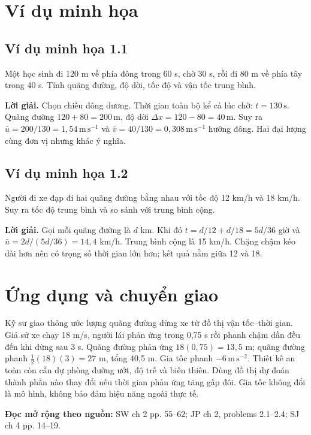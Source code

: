 \documentclass[11pt,a4paper,openany]{book}
\begin{document}
\section{Ví dụ minh họa}
\subsection*{Ví dụ minh họa 1.1}
Một học sinh đi 120 m về phía đông trong 60 s, chờ 30 s, rồi đi 80 m về phía tây trong 40 s. Tính quãng đường, độ dời, tốc độ và vận tốc trung bình.

\textbf{Lời giải.} Chọn chiều đông dương. Thời gian toàn bộ kể cả lúc chờ: $t=130\,\mathrm{s}$. Quãng đường $120+80=200\,\mathrm{m}$, độ dời $\Delta x=120-80=40\,\mathrm{m}$. Suy ra $\bar u=200/130=1{,}54\,\mathrm{m\,s^{-1}}$ và $\bar v=40/130=0{,}308\,\mathrm{m\,s^{-1}}$ hướng đông. Hai đại lượng cùng đơn vị nhưng khác ý nghĩa.
\subsection*{Ví dụ minh họa 1.2}
Người đi xe đạp đi hai quãng đường bằng nhau với tốc độ 12 km/h và 18 km/h. Suy ra tốc độ trung bình và so sánh với trung bình cộng.

\textbf{Lời giải.} Gọi mỗi quãng đường là $d$ km. Khi đó $t=d/12+d/18=5d/36$ giờ và $\bar u=2d/(5d/36)=14{,}4$ km/h. Trung bình cộng là 15 km/h. Chặng chậm kéo dài hơn nên có trọng số thời gian lớn hơn; kết quả nằm giữa 12 và 18.
\section{Ứng dụng và chuyển giao}
Kỹ sư giao thông ước lượng quãng đường dừng xe từ đồ thị vận tốc--thời gian. Giả sử xe chạy 18 m/s, người lái phản ứng trong 0,75 s rồi phanh chậm dần đều đến khi dừng sau 3 s. Quãng đường phản ứng $18(0{,}75)=13{,}5$ m; quãng đường phanh $\frac12(18)(3)=27$ m, tổng 40,5 m. Gia tốc phanh $-6\,\mathrm{m\,s^{-2}}$. Thiết kế an toàn còn cần dự phòng đường ướt, độ trễ và biến thiên. Dùng đồ thị dự đoán thành phần nào thay đổi nếu thời gian phản ứng tăng gấp đôi. Gia tốc không đổi là mô hình, không bảo đảm hiệu năng ngoài thực tế.

\textbf{Đọc mở rộng theo nguồn:} SW ch 2 pp. 55–62; JP ch 2, problems 2.1–2.4; SJ ch 4 pp. 14–19.
\end{document}
